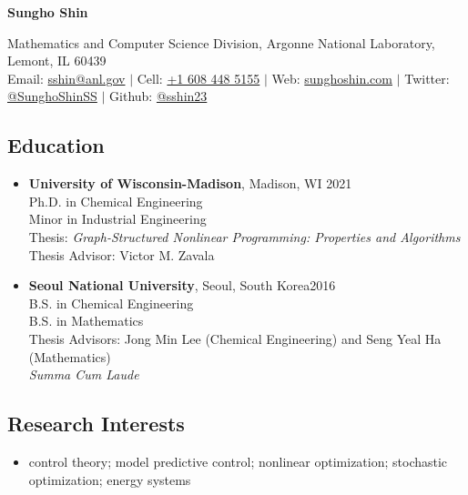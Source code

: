 \documentclass[letterpaper, 11pt]{article}
\begin{document}
\thispagestyle{empty}
\begin{center}
  {\bf\Large Sungho Shin}
\end{center}
\begin{center}
  {Mathematics and Computer Science Division}, {Argonne National Laboratory}, Lemont, IL 60439\\
  Email: \href{mailto:sshin@anl.gov}{sshin@anl.gov} $|$ Cell: \href{tel:16084485155}{+1 608 448 5155} $|$ Web: \href{https://sunghoshin.com}{sunghoshin.com} $|$ Twitter: \href{https://twitter.com/SunghoShinSS}{@SunghoShinSS} $|$ Github: \href{https://github.com/sshin23}{@sshin23}
\end{center}


\subsection*{Education}
\begin{itemize}[leftmargin=*]
\item[]
  {\bf University of Wisconsin-Madison}, Madison, WI \hfill 2021\\
  {Ph.D. in Chemical Engineering} \\
  {Minor in Industrial Engineering}\\
  Thesis: {\it Graph-Structured Nonlinear Programming: Properties and Algorithms}\\
  Thesis Advisor: Victor M. Zavala
\item[]
  {\bf Seoul National University}, Seoul, South Korea\hfill 2016 \\
  {B.S. in Chemical Engineering}\\
  {B.S. in Mathematics}\\
  Thesis Advisors: Jong Min Lee (Chemical Engineering) and Seng Yeal Ha (Mathematics)\\
  {\it Summa Cum Laude}
\end{itemize}

\subsection*{Research Interests}
\begin{itemize}[leftmargin=*]
\item[] control theory; model predictive control; nonlinear optimization; stochastic optimization; energy systems
\end{itemize}
\end{document}
